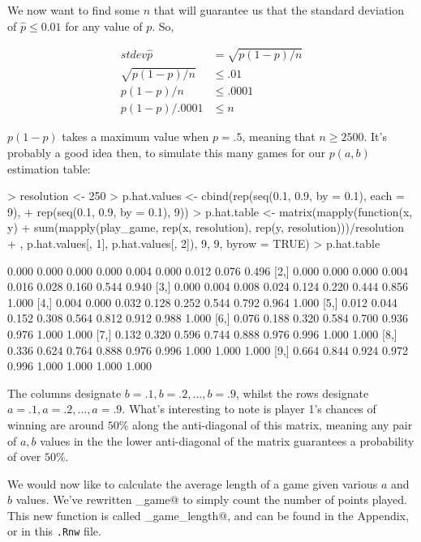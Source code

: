 \documentclass[10pt, oneside, reqno]{article}
\theoremstyle{plain}
\begin{document}
We now want to find some $n$ that will guarantee us that the standard deviation of $\hat{p}\leq 0.01$ for any value of $p$. So,

\begin{align}
	stdev \hat{p} &= \sqrt{p(1-p)/n}\\
	\sqrt{p(1-p)/n} &\leq .01\\
 	p(1-p)/n &\leq .0001\\
	p(1-p)/.0001 &\leq  n
\end{align}

	$p(1-p)$ takes a maximum value when $p=.5$, meaning that $n\geq 2500$. It's probably a good idea then, to simulate this many games for our $p(a,b)$ estimation table:
	
\begin{Schunk}
\begin{Sinput}
> resolution <- 250
> p.hat.values <- cbind(rep(seq(0.1, 0.9, by = 0.1), each = 9), 
+     rep(seq(0.1, 0.9, by = 0.1), 9))
> p.hat.table <- matrix(mapply(function(x, y) {
+     sum(mapply(play_game, rep(x, resolution), rep(y, resolution)))/resolution
+ }, p.hat.values[, 1], p.hat.values[, 2]), 9, 9, byrow = TRUE)
> p.hat.table
\end{Sinput}
\begin{Soutput}
       [,1]  [,2]  [,3]  [,4]  [,5]  [,6]  [,7]  [,8]  [,9]
 [1,] 0.000 0.000 0.000 0.000 0.004 0.000 0.012 0.076 0.496
 [2,] 0.000 0.000 0.000 0.004 0.016 0.028 0.160 0.544 0.940
 [3,] 0.000 0.004 0.008 0.024 0.124 0.220 0.444 0.856 1.000
 [4,] 0.004 0.000 0.032 0.128 0.252 0.544 0.792 0.964 1.000
 [5,] 0.012 0.044 0.152 0.308 0.564 0.812 0.912 0.988 1.000
 [6,] 0.076 0.188 0.320 0.584 0.700 0.936 0.976 1.000 1.000
 [7,] 0.132 0.320 0.596 0.744 0.888 0.976 0.996 1.000 1.000
 [8,] 0.336 0.624 0.764 0.888 0.976 0.996 1.000 1.000 1.000
 [9,] 0.664 0.844 0.924 0.972 0.996 1.000 1.000 1.000 1.000
\end{Soutput}
\end{Schunk}

The columns designate $b=.1, b=.2,\ldots, b=.9$, whilst the rows designate $a=.1, a=.2,\ldots, a=.9$. What's interesting to note is player 1's chances of winning are around $50$\%  along the anti-diagonal of this matrix, meaning any pair of $a,b$ values in the the lower anti-diagonal of the matrix guarantees a probability of over $50$\%. 

We would now like to calculate the average length of a game given various $a$ and $b$ values. We've rewritten \verb@play_game@ to simply count the number of points played. This new function is called \verb@play_game_length@, and can be found in the Appendix, or in this \texttt{.Rnw} file. 
\end{document}
